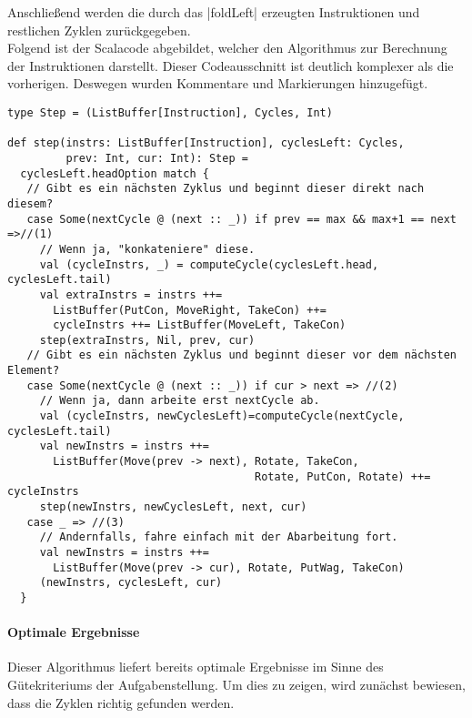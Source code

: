 Anschließend werden die durch das |foldLeft| erzeugten Instruktionen und restlichen Zyklen zurück\-ge\-ge\-ben.\\
Folgend ist der Scalacode abgebildet, welcher den Algorithmus zur Berechnung der Instruktionen darstellt.
Dieser Codeausschnitt ist deutlich komplexer als die vorherigen. Deswegen wurden Kommentare und Markierungen hinzugefügt.
\lstset{basicstyle=\ttfamily\small}
\begin{lstlisting}
type Step = (ListBuffer[Instruction], Cycles, Int)

def step(instrs: ListBuffer[Instruction], cyclesLeft: Cycles,
         prev: Int, cur: Int): Step =
  cyclesLeft.headOption match {
   // Gibt es ein nächsten Zyklus und beginnt dieser direkt nach diesem?
   case Some(nextCycle @ (next :: _)) if prev == max && max+1 == next =>//(1)
     // Wenn ja, "konkateniere" diese.
     val (cycleInstrs, _) = computeCycle(cyclesLeft.head, cyclesLeft.tail)
     val extraInstrs = instrs ++=
       ListBuffer(PutCon, MoveRight, TakeCon) ++=
       cycleInstrs ++= ListBuffer(MoveLeft, TakeCon)
     step(extraInstrs, Nil, prev, cur)
   // Gibt es ein nächsten Zyklus und beginnt dieser vor dem nächsten Element?
   case Some(nextCycle @ (next :: _)) if cur > next => //(2)
     // Wenn ja, dann arbeite erst nextCycle ab.
     val (cycleInstrs, newCyclesLeft)=computeCycle(nextCycle, cyclesLeft.tail)
     val newInstrs = instrs ++=
       ListBuffer(Move(prev -> next), Rotate, TakeCon,
                                      Rotate, PutCon, Rotate) ++= cycleInstrs
     step(newInstrs, newCyclesLeft, next, cur)
   case _ => //(3)
     // Andernfalls, fahre einfach mit der Abarbeitung fort.
     val newInstrs = instrs ++=
       ListBuffer(Move(prev -> cur), Rotate, PutWag, TakeCon)
     (newInstrs, cyclesLeft, cur)
  }
\end{lstlisting}
\lstset{basicstyle=\ttfamily\normalsize}

\paragraph{Optimale Ergebnisse}
\label{opt_res}
Dieser Algorithmus liefert bereits optimale Ergebnisse im Sinne des Güte\-kri\-ter\-iums der Aufgabenstellung.
Um dies zu zeigen, wird zunächst bewiesen, dass die Zyklen richtig gefunden werden. \\

